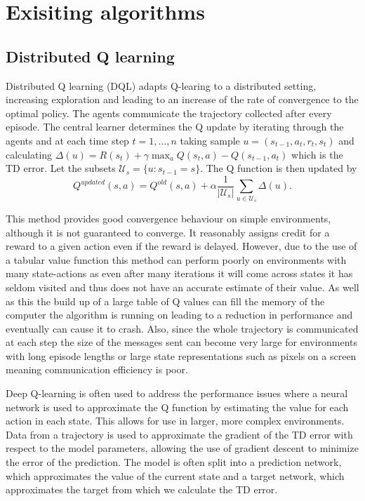\section{Exisiting algorithms}
\subsection{Distributed Q learning}
Distributed Q learning (DQL) adapts Q-learing to a distributed setting, increasing exploration and leading to an increase of the rate of convergence to the optimal policy. 
The agents communicate the trajectory collected after every episode.
The central learner determines the Q update by iterating through the agents and at each time step $t=1,\dots,n$ taking sample $u = (s_{t-1},a_t,r_t,s_t)$  and calculating $\Delta(u) = R(s_t) + \gamma \max_a Q(s_t,a) - Q(s_{t-1},a_t)$ which is the TD error.
Let the subsets $\mathcal{U}_s = \{u: s_{t-1}=s\}$.
The Q function is then updated by 
\begin{equation*}
    Q^{updated}(s,a) = Q^{old}(s,a) + \alpha \frac{1}{|\mathcal{U}_s|} \sum_{u \in \mathcal{U}_s} \Delta(u).
\end{equation*}

This method provides good convergence behaviour on simple environments, although it is not guaranteed to converge. It reasonably assigns credit for a reward to a given action even if the reward is delayed. However, due to the use of a tabular value function this method can perform poorly on environments with many state-actions as even after many iterations it will come across states it has seldom visited and thus does not have an accurate estimate of their value. As well as this the build up of a large table of Q values can fill the memory of the computer the algorithm is running on leading to a reduction in performance and eventually can cause it to crash.
Also, since the whole trajectory is communicated at each step the size of the messages sent can become very large for environments with long episode lengths or large state representations such as pixels on a screen meaning communication efficiency is poor.

Deep Q-learning is often used to address the performance issues where a neural network is used to approximate the Q function by estimating the value for each action in each state. This allows for use in larger, more complex environments. Data from a trajectory is used to approximate the gradient of the TD error with respect to the model parameters, allowing the use of gradient descent to minimize the error of the prediction. The model is often split into a prediction network, which approximates the value of the current state and a target network, which approximates the target from which we calculate the TD error.

